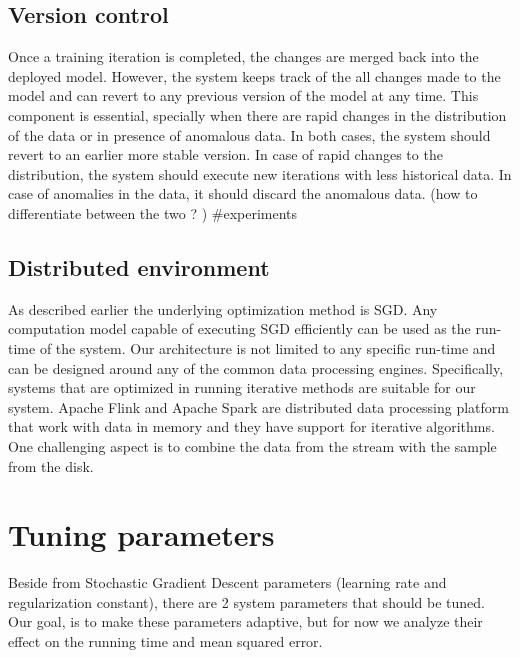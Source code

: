 \documentclass{sig-alternate-05-2015}
\begin{document}
\subsection{Version control} \label{version-control}
Once a training iteration is completed, the changes are merged back into the deployed model.
However, the system keeps track of the all changes made to the model and can revert to any previous version of the model at any time.
This component is essential, specially when there are rapid changes in the distribution of the data or in presence of anomalous data.
In both cases, the system should revert to an earlier more stable version.
In case of rapid changes to the distribution, the system should execute new iterations with less historical data.
In case of anomalies in the data, it should discard the anomalous data. (how to differentiate between the two ? ) \#experiments

\subsection{Distributed environment}
As described earlier the underlying optimization method is SGD.
Any computation model capable of executing SGD efficiently can be used as the run-time of the system.
Our architecture is not limited to any specific run-time and can be designed around any of the common data processing engines.
Specifically, systems that are optimized in running iterative methods are suitable for our system.
Apache Flink \cite{carbone2015apache, alexandrov2014stratosphere} and Apache Spark \cite{zaharia2010spark} are distributed data processing platform that work with data in memory and they have support for iterative algorithms.
One challenging aspect is to combine the data from the stream with the sample from the disk. 



\section{Tuning parameters} \label{tuning}
Beside from Stochastic Gradient Descent parameters (learning rate and regularization constant), there are 2 system parameters that should be tuned. 
Our goal, is to make these parameters adaptive, but for now we analyze their effect on the running time and mean squared error. 
\end{document}
